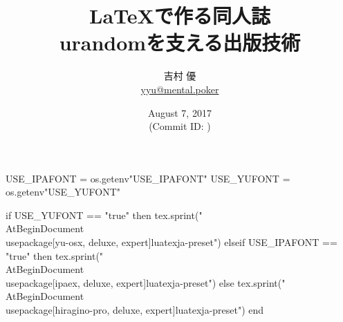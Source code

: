 \hypersetup{colorlinks,linkcolor=,urlcolor=links}

\beamertemplatenavigationsymbolsempty


\usepackage{luacode}
\usepackage{luatexja}
\usepackage{pgfpages}

\begin{luacode*}
  USE_IPAFONT = os.getenv"USE_IPAFONT"
  USE_YUFONT = os.getenv"USE_YUFONT"
  
  if USE_YUFONT == "true" then
    tex.sprint("\\AtBeginDocument{\\usepackage[yu-osx, deluxe, expert]{luatexja-preset}}")
  elseif USE_IPAFONT == "true" then
    tex.sprint("\\AtBeginDocument{\\usepackage[ipaex, deluxe, expert]{luatexja-preset}}")
  else
    tex.sprint("\\AtBeginDocument{\\usepackage[hiragino-pro, deluxe, expert]{luatexja-preset}}")
  end
\end{luacode*}

\usepackage{epigraph}
\usepackage{etoolbox}
\usepackage{tikz}
\usepackage{framed}
\usepackage[ss]{libertine}
\usepackage{amsmath}
\usepackage{mathtools}
\usepackage{listings}
\usepackage{tikz-qtree}

\renewcommand{\kanjifamilydefault}{\gtdefault}


\setmonofont[Ligatures=TeX]{CMU Typewriter Text}



\title[\LaTeX で作る同人誌]{%
  \LaTeX で作る同人誌 \\
  {\normalsize urandomを支える出版技術}
}
\author[吉村 優]{%
  吉村 優 \\
  {\scriptsize \href{mailto:yyu@mental.poker}{yyu@mental.poker}}
}
\date[August 7, 2017]{%
  August 7, 2017 \\%
  {\footnotesize (Commit ID: \GITAbrHash)}
}






